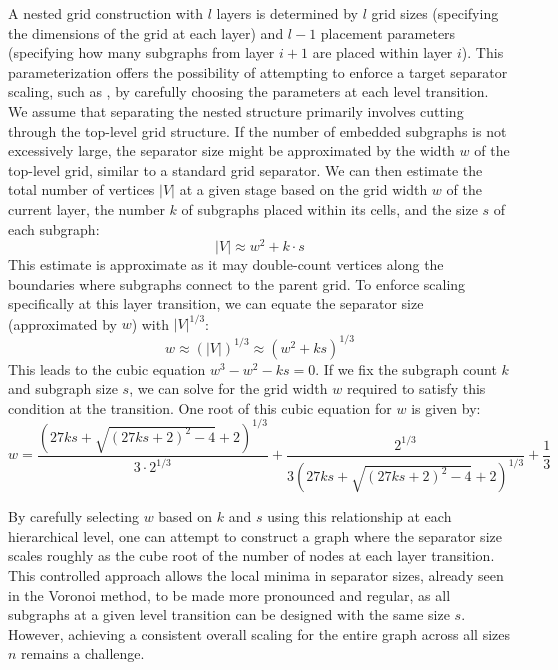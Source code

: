 A nested grid construction with \(l\) layers is determined by \(l\) grid sizes (specifying the dimensions of the grid at each layer) and \(l-1\) placement parameters (specifying how many subgraphs from layer \(i+1\) are placed within layer \(i\)).
This parameterization offers the possibility of attempting to enforce a target separator scaling, such as , by carefully choosing the parameters at each level transition.
We assume that separating the nested structure primarily involves cutting through the top-level grid structure.
If the number of embedded subgraphs is not excessively large, the separator size might be approximated by the width \(w\) of the top-level grid, similar to a standard grid separator.
We can then estimate the total number of vertices \(|V|\) at a given stage based on the grid width \(w\) of the current layer, the number \(k\) of subgraphs placed within its cells, and the size \(s\) of each subgraph:
\[ |V| \approx w^2 + k \cdot s \]
This estimate is approximate as it may double-count vertices along the boundaries where subgraphs connect to the parent grid.
To enforce  scaling specifically at this layer transition, we can equate the separator size (approximated by \(w\)) with \(|V|^{1/3}\):
\[ w \approx (|V|)^{1/3} \approx (w^2 + ks)^{1/3} \]
This leads to the cubic equation \( w^3 - w^2 - ks = 0 \).
If we fix the subgraph count \(k\) and subgraph size \(s\), we can solve for the grid width \(w\) required to satisfy this condition at the transition.
One root of this cubic equation for \(w\) is given by:
\[ w = \frac{(27 k s + \sqrt{(27 k s + 2)^2 - 4} + 2)^{1/3}}{3 \cdot 2^{1/3}} + \frac{2^{1/3}}{3 (27 k s + \sqrt{(27 k s + 2)^2 - 4} + 2)^{1/3}} + \frac{1}{3} \]

By carefully selecting \(w\) based on \(k\) and \(s\) using this relationship at each hierarchical level, one can attempt to construct a graph where the separator size scales roughly as the cube root of the number of nodes at each layer transition.
This controlled approach allows the local minima in separator sizes, already seen in the Voronoi method, to be made more pronounced and regular, as all subgraphs at a given level transition can be designed with the same size \(s\).
However, achieving a consistent overall  scaling for the entire graph across all sizes \(n\) remains a challenge.

